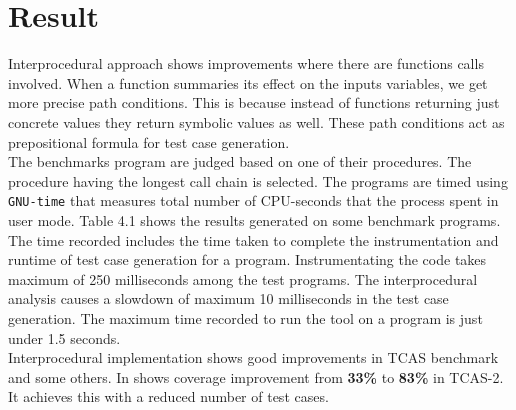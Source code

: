\documentclass[12pt,oneside]{book}
\begin{document}
\section{Result}
 Interprocedural approach shows improvements where there are functions calls involved. When a function summaries its effect on the inputs variables, we get more precise path conditions. This is because instead of functions returning just concrete values they return symbolic values as well. These path conditions act as prepositional formula for test case generation. \\
The benchmarks program are judged based on one of their procedures. The procedure having the longest call chain is selected. The programs are timed using \texttt{GNU-time} that measures total number of CPU-seconds that the process spent in user mode. Table 4.1 shows the results generated on some benchmark programs. The time recorded includes the time taken to complete the instrumentation and runtime of test case generation for a program. Instrumentating the code takes maximum of 250 milliseconds among the test programs. The interprocedural analysis causes a slowdown of maximum 10 milliseconds in the test case generation. The maximum time recorded to run the tool on a program is just under 1.5 seconds.
\\

Interprocedural implementation shows good improvements in TCAS benchmark and some others. In shows coverage improvement from \textbf{33\%} to \textbf{83\%} in TCAS-2. It achieves this with a reduced number of test cases.  
\end{document}
